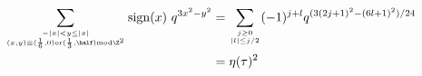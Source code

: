 \begin{equation}\label{eta-square-0}
      \begin{split}
   \sum_{-|x|<y\leq |x|\atop (x,y)\equiv ({1\over 6},0) {\rm
    or } ({1\over 3},\half) {\rm mod}\Z^2} {\rm sign}(x)~
    q^{3x^2 -y^2}  &= \sum_{j \geq 0\atop
      |l|\leq j/2} (-1)^{j+l} q^{(3(2j+1)^2-(6l+1)^2)/24}\\
  &= \eta(\tau)^2
      \end{split}
\end{equation}

